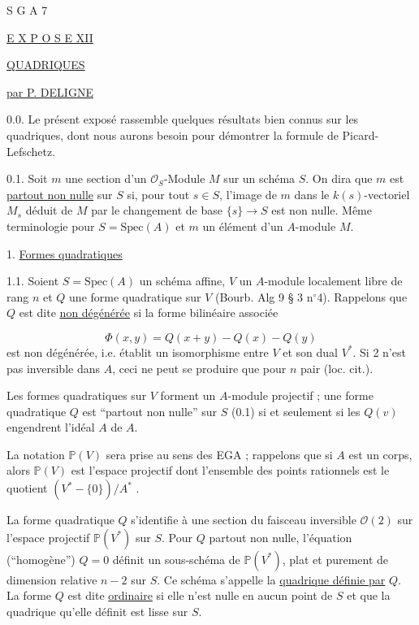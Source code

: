 


S G A 7


\underline{E X P O S E XII}


\underline{QUADRIQUES}


\underline{par P. DELIGNE}

0.0. Le présent exposé rassemble quelques résultats bien connus sur les quadriques, dont nous aurons besoin pour démontrer la formule de Picard-Lefschetz.

0.1. Soit $m$ une section d'un $\mathcal{O}_S$-Module $M$ sur un schéma $S$. On dira que $m$ est \underline{partout non nulle} sur $S$ si, pour tout $s \in S$, l'image de $m$ dans le $k(s)$-vectoriel $M_s$ déduit de $M$ par le changement de base $\{s\} \longrightarrow S$ est non nulle. Même terminologie pour $S = \mathrm{Spec}(A)$ et $m$ un élément d'un $A$-module $M$.


1. \underline{Formes quadratiques}

1.1. Soient $S = \mathrm{Spec}(A)$ un schéma affine, $V$ un $A$-module localement libre de rang $n$ et $Q$ une forme quadratique sur $V$ (Bourb. Alg 9 \S{} 3 n$^\circ$4). Rappelons que $Q$ est dite \underline{non dégénérée} si la forme bilinéaire associée

\begin{equation*}
\Phi(x,y) = Q(x+y) - Q(x) - Q(y)
\end{equation*}
est non dégénérée, i.e. établit un isomorphisme entre $V$ et son dual $V^*$. Si 2 n'est pas inversible dans $A$, ceci ne peut se produire que pour $n$ pair (loc. cit.).



Les formes quadratiques sur $V$ forment un $A$-module projectif ; une forme quadratique $Q$ est ``partout non nulle'' sur $S$ (0.1) si et seulement si les $Q(v)$ engendrent l'idéal $A$ de $A$.

La notation $\mathbb{P}(V)$ sera prise au sens des EGA ; rappelons que si $A$ est un corps, alors $\mathbb{P}(V)$ est l'espace projectif dont l'ensemble des points rationnels est le quotient $(V^* - \{0\})/A^*$ .

La forme quadratique $Q$ s'identifie à une section du faisceau inversible $\mathcal{O}(2)$ sur l'espace projectif $\mathbb{P}(V^*)$ sur $S$. Pour $Q$ partout non nulle, l'équation (``homogène'') $Q = 0$ définit un sous-schéma de $\mathbb{P}(V^*)$, plat et purement de dimension relative $n-2$ sur $S$. Ce schéma s'appelle la \underline{quadrique définie par} $Q$. La forme $Q$ est dite \underline{ordinaire} si elle n'est nulle en aucun point de $S$ et que la quadrique qu'elle définit est lisse sur $S$.

